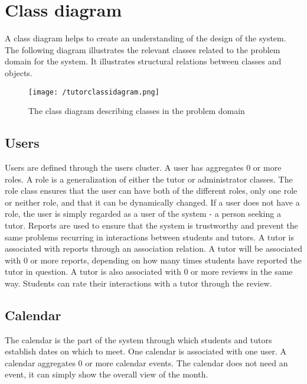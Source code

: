 \section{Class diagram}
A class diagram helps to create an understanding of the design of the system.
The following diagram illustrates the relevant classes related to the problem domain for the system.
It illustrates structural relations between classes and objects.

\begin{figure}[H]
    \texttt{[image: /tutorclassidagram.png]}
     \caption{The class diagram describing classes in the problem domain}
     \label{fig:class-diagram}
 \end{figure}

\subsection{Users}
Users are defined through the users cluster.
A user has aggregates 0 or more roles. 
A role is a generalization of either the tutor or administrator classes. 
The role class ensures that the user can have both of the different roles, only one role or neither role, and that it can be dynamically changed.
If a user does not have a role, the user is simply regarded as a user of the system - a person seeking a tutor. 
Reports are used to ensure that the system is trustworthy and prevent the same problems recurring in interactions between students and tutors.
A tutor is associated with reports through an association relation.
A tutor will be associated with 0 or more reports, depending on how many times students have reported the tutor in question.
A tutor is also associated with 0 or more reviews in the same way. 
Students can rate their interactions with a tutor through the review.

\subsection{Calendar}
The calendar is the part of the system through which students and tutors establish dates on which to meet. 
One calendar is associated with one user.
A calendar aggregates 0 or more calendar events. 
The calendar does not need an event, it can simply show the overall view of the month.

